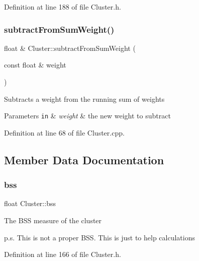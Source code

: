 Definition at line 188 of file Cluster.\+h.

\mbox{\label{class_cluster_a93b4f6092b558747d0882bf0af959da8}} 
\subsubsection{\texorpdfstring{subtract\+From\+Sum\+Weight()}{subtractFromSumWeight()}}
{\footnotesize\ttfamily float \& Cluster\+::subtract\+From\+Sum\+Weight (\begin{DoxyParamCaption}\item[{const float \&}]{weight }\end{DoxyParamCaption})}

Subtracts a weight from the running sum of weights


\begin{DoxyParams}[1]{Parameters}
\mbox{\tt in}  & {\em weight} & the new weight to subtract \\
\hline
\end{DoxyParams}


Definition at line 68 of file Cluster.\+cpp.



\subsection{Member Data Documentation}
\mbox{\label{class_cluster_aa83d01b4c4d33763154c82cbfdce7fff}} 
\subsubsection{\texorpdfstring{bss}{bss}}
{\footnotesize\ttfamily float Cluster\+::bss\hspace{0.3cm}{\ttfamily [protected]}}

The B\+SS measure of the cluster

p.\+s. This is not a proper B\+SS. This is just to help calculations 

Definition at line 166 of file Cluster.\+h.

\mbox{\label{class_cluster_a06b612a067c349bd2a56d1960d229e2a}} 
